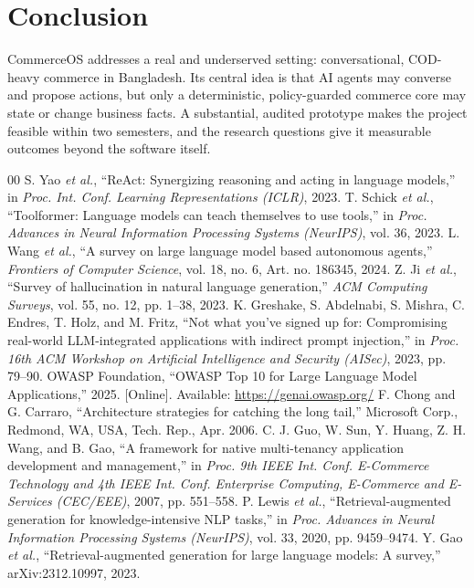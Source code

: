 \documentclass[conference,a4paper]{IEEEtran}
\begin{document}
\section{Conclusion}
CommerceOS addresses a real and underserved setting: conversational, COD-heavy commerce in Bangladesh. Its central idea is that AI agents may converse and propose actions, but only a deterministic, policy-guarded commerce core may state or change business facts. A substantial, audited prototype makes the project feasible within two semesters, and the research questions give it measurable outcomes beyond the software itself.


\begin{thebibliography}{00}
 S. Yao \textit{et al.}, ``ReAct: Synergizing reasoning and acting in language models,'' in \textit{Proc. Int. Conf. Learning Representations (ICLR)}, 2023.
 T. Schick \textit{et al.}, ``Toolformer: Language models can teach themselves to use tools,'' in \textit{Proc. Advances in Neural Information Processing Systems (NeurIPS)}, vol. 36, 2023.
 L. Wang \textit{et al.}, ``A survey on large language model based autonomous agents,'' \textit{Frontiers of Computer Science}, vol. 18, no. 6, Art. no. 186345, 2024.
 Z. Ji \textit{et al.}, ``Survey of hallucination in natural language generation,'' \textit{ACM Computing Surveys}, vol. 55, no. 12, pp. 1--38, 2023.
 K. Greshake, S. Abdelnabi, S. Mishra, C. Endres, T. Holz, and M. Fritz, ``Not what you've signed up for: Compromising real-world LLM-integrated applications with indirect prompt injection,'' in \textit{Proc. 16th ACM Workshop on Artificial Intelligence and Security (AISec)}, 2023, pp. 79--90.
 OWASP Foundation, ``OWASP Top 10 for Large Language Model Applications,'' 2025. [Online]. Available: \url{https://genai.owasp.org/}
 F. Chong and G. Carraro, ``Architecture strategies for catching the long tail,'' Microsoft Corp., Redmond, WA, USA, Tech. Rep., Apr. 2006.
 C. J. Guo, W. Sun, Y. Huang, Z. H. Wang, and B. Gao, ``A framework for native multi-tenancy application development and management,'' in \textit{Proc. 9th IEEE Int. Conf. E-Commerce Technology and 4th IEEE Int. Conf. Enterprise Computing, E-Commerce and E-Services (CEC/EEE)}, 2007, pp. 551--558.
 P. Lewis \textit{et al.}, ``Retrieval-augmented generation for knowledge-intensive NLP tasks,'' in \textit{Proc. Advances in Neural Information Processing Systems (NeurIPS)}, vol. 33, 2020, pp. 9459--9474.
 Y. Gao \textit{et al.}, ``Retrieval-augmented generation for large language models: A survey,'' arXiv:2312.10997, 2023.

\end{thebibliography}
\end{document}
